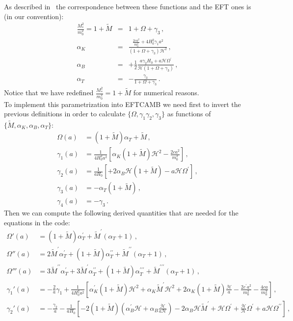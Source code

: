 \documentclass[prd,nofootinbib,showpacs]{revtex4}
\def\l{\left}
\def\r{\right}
\def\f{\frac}
\def\nn{\nonumber}
\def\hub{{\mathcal H}}
\begin{document}
{As described in~\cite{Bellini:2014fua}  the correspondence between these functions and the EFT ones is (in our convention):
 \begin{eqnarray}
\f{M_*^2}{m_0^2}=1+ \tilde{M}&=& 1+\Omega+ \gamma_3 \, , \nn \\
\alpha_K&= & \f{\f{2ca^2}{m_0^2}+4H_0^2\gamma_1a^2}{(1+\Omega+ \gamma_3)\hub^2} \, ,\nn \\
\alpha_B&=&  +\f{1}{2}\f{a\gamma_2H_0+a\hub\Omega^\prime}{\hub(1+\Omega+ \gamma_3) } \,, \nn \\
\alpha_T&=& -\f{\gamma_3}{1+\Omega+ \gamma_3} \,.
\end{eqnarray}
Notice that we have redefined $\f{M_*^2}{m_0^2}=1+ \tilde{M}$ for numerical reasons. \\
To implement this parametrization into EFTCAMB we need first to invert the previous definitions in order to calculate $\{\Omega, \gamma_1\gamma_2,\gamma_3\}$ as functions of $\{\tilde{M},\alpha_K,\alpha_B,\alpha_T\}$:
\begin{align}
\Omega(a) &= (1+ \tilde{M})\alpha_T+ \tilde{M}\,, \nonumber \\
\gamma_1(a) &= \f{1}{4H_0^2a^2}\l[\alpha_K(1+ \tilde{M})\hub^2-\f{2ca^2}{m_0^2}\r]\,,  \nonumber \\
\gamma_2(a) &=  \f{1}{aH_0}\l[+2\alpha_B\hub (1+ \tilde{M})-a\hub\Omega^\prime\r] \,,  \nonumber \\
\gamma_3(a) &= -\alpha_T(1+ \tilde{M}) \,,  \nonumber \\
\gamma_4(a) &= -\gamma_3\,.
\end{align}
%
Then we can compute the following derived quantities that are needed for the equations in the code:
\begin{align}
\Omega'(a) &=  (1+\tilde{M})\alpha_T^\prime+ \tilde{M}^\prime(\alpha_T+1)\,,  \nonumber \\ 
\Omega''(a) &= 2\tilde{M}^\prime \alpha_T^\prime + (1+\tilde{M})\alpha_T^{\prime\prime}+\tilde{M}^{\prime\prime}(\alpha_T+1)\,,  \nonumber \\
\Omega'''(a) &=   3\tilde{M}^{\prime\prime}\alpha_T^\prime+3\tilde{M}^\prime\alpha_T^{\prime\prime}+ (1+\tilde{M})\alpha_T^{\prime\prime\prime}+\tilde{M}^{\prime\prime\prime}(\alpha_T+1)\,,  \nonumber \\
\gamma_1'(a) &= -\f{2}{a}\gamma_1+\f{1}{4H_0^2a^2}\l[\alpha_K^\prime(1+ \tilde{M})\hub^2+\alpha_K\tilde{M}^\prime\hub^2+2\alpha_K(1+ \tilde{M})\f{\dot{\hub}}{a}-\f{2c^\prime a^2}{m_0^2}-\f{4ca}{m_0^2}\r] \,,  \nonumber \\
\gamma_2'(a) &=  -\f{\gamma_2}{a} -\f{1}{aH_0}\l[-2(1+ \tilde{M})(\alpha_B^\prime\hub+\alpha_B \f{\dot{\hub}}{a\hub}) -2\alpha_B\hub \tilde{M}^\prime+ \hub\Omega^\prime+\f{\dot{\hub}}{\hub}\Omega^\prime+a\hub\Omega^{\prime\prime}\r] \,,  \nonumber \\

\end{align}}
\end{document}

